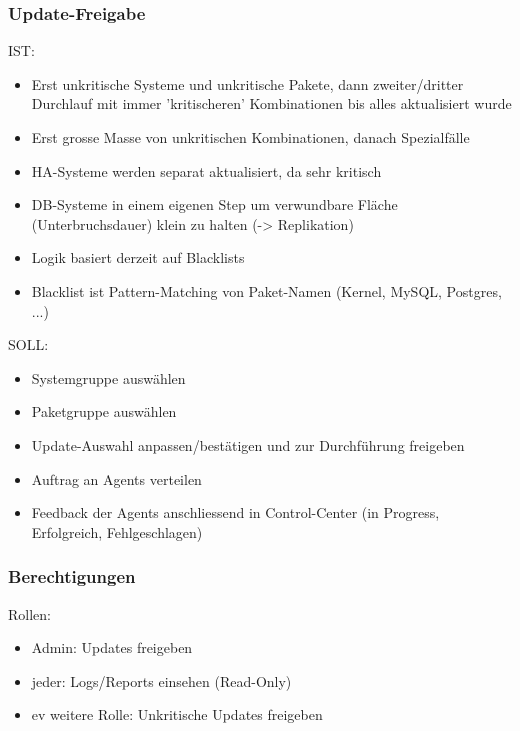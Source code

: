 \documentclass[class=scrbook,crop=false]{standalone}
\begin{document}
    \subsubsection{Update-Freigabe}
    
    IST:
    
    \begin{itemize}
        \item Erst unkritische Systeme und unkritische Pakete, dann zweiter/dritter Durchlauf mit immer 'kritischeren' Kombinationen bis alles aktualisiert wurde
        \item Erst grosse Masse von unkritischen Kombinationen, danach Spezialfälle
        \item HA-Systeme werden separat aktualisiert, da sehr kritisch
        \item DB-Systeme in einem eigenen Step um verwundbare Fläche (Unterbruchsdauer) klein zu halten (-> Replikation)
        \item Logik basiert derzeit auf Blacklists
        \item Blacklist ist Pattern-Matching von Paket-Namen (Kernel, MySQL, Postgres, ...)
    \end{itemize}
    
    SOLL:
    
    \begin{itemize}
        \item Systemgruppe auswählen
        \item Paketgruppe auswählen
        \item Update-Auswahl anpassen/bestätigen und zur Durchführung freigeben
        \item Auftrag an Agents verteilen
        \item Feedback der Agents anschliessend in Control-Center (in Progress, Erfolgreich, Fehlgeschlagen)
    \end{itemize}
    
    \subsubsection{Berechtigungen}
    
    Rollen:
    
    \begin{itemize}
        \item Admin: Updates freigeben
        \item jeder: Logs/Reports einsehen (Read-Only)
        \item ev weitere Rolle: Unkritische Updates freigeben
    \end{itemize}
    
\end{document}
